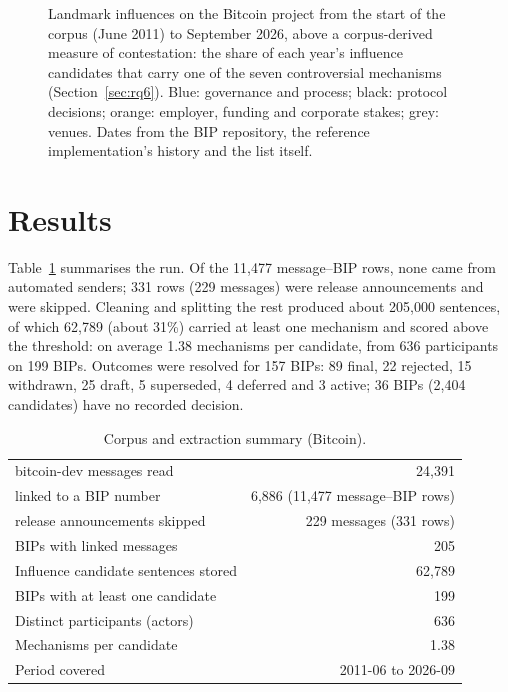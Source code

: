 \documentclass[sigconf,screen]{acmart}
\begin{document}
\begin{figure}[t]
\caption{Landmark influences on the Bitcoin project from the start of the corpus (June 2011) to September 2026, above a corpus-derived measure of contestation: the share of each year's influence candidates that carry one of the seven controversial mechanisms (Section~\ref{sec:rq6}). Blue: governance and process; black: protocol decisions; orange: employer, funding and corporate stakes; grey: venues. Dates from the BIP repository, the reference implementation's history and the list itself.}
\label{fig:timeline}
\end{figure}
\section{Results}
\label{sec:results}

Table~\ref{tab:corpus} summarises the run. Of the 11,477 message--BIP rows, none came from automated senders; 331 rows (229 messages) were release announcements and were skipped. Cleaning and splitting the rest produced about 205,000 sentences, of which 62,789 (about 31\%) carried at least one mechanism and scored above the threshold: on average 1.38 mechanisms per candidate, from 636 participants on 199 BIPs. Outcomes were resolved for 157 BIPs: 89 final, 22 rejected, 15 withdrawn, 25 draft, 5 superseded, 4 deferred and 3 active; 36 BIPs (2,404 candidates) have no recorded decision.

\begin{table}[t]
\caption{Corpus and extraction summary (Bitcoin).}
\label{tab:corpus}
\small
\begin{tabular}{lr}
\toprule
bitcoin-dev messages read & 24,391 \\
\quad linked to a BIP number & 6,886 (11,477 message--BIP rows) \\
\quad release announcements skipped & 229 messages (331 rows) \\
BIPs with linked messages & 205 \\
Influence candidate sentences stored & 62,789 \\
BIPs with at least one candidate & 199 \\
Distinct participants (actors) & 636 \\
Mechanisms per candidate & 1.38 \\
Period covered & 2011-06 to 2026-09 \\
\bottomrule
\end{tabular}
\end{table}
\end{document}
